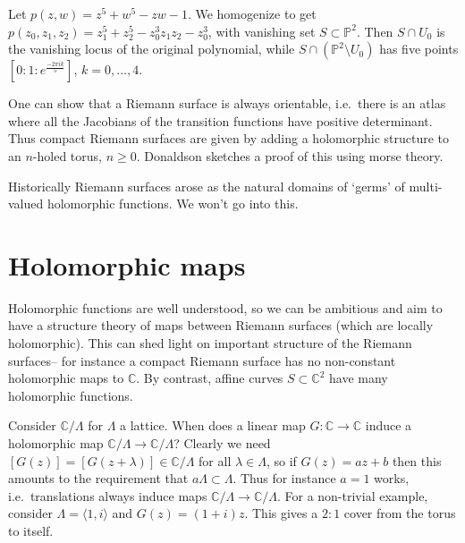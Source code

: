 \begin{example}
    Let \(p(z,w)=z^5+w^5-zw-1\). We homogenize to get
    \(p(z_0,z_1,z_2)=z_1^5+z_2^5-z_0^3z_1z_2-z_0^3\), with vanishing set
    \(S\subset \mathbb{P}^2\). Then \(S\cap U_0\) is the vanishing locus of the
    original polynomial, while \(S\cap (\mathbb{P}^2\setminus U_0)\) has five
    points \([0:1:e^{\frac{-2\pi i k}{5}}]\), \(k=0,\ldots,4\).
\end{example}

\begin{remark}
    One can show that a Riemann surface is always orientable, i.e.\ there is an
    atlas where all the Jacobians of the transition functions have positive
    determinant. Thus compact Riemann surfaces are given by adding a holomorphic
    structure to an \(n\)-holed torus, \(n\geq 0\). Donaldson sketches a proof
    of this using morse theory.
\end{remark}

\begin{remark}
    Historically Riemann surfaces arose as the natural domains of `germs' of
    multi-valued holomorphic functions. We won't go into this.

\end{remark}


\section{Holomorphic maps}
Holomorphic functions are well understood, so we can be ambitious and aim to
have a structure theory of maps between Riemann surfaces (which are locally
holomorphic). This can shed light on important structure of the Riemann
surfaces-- for instance a compact Riemann surface has no non-constant
holomorphic maps to \(\mathbb{C}\). By contrast, affine curves \(S\subset
\mathbb{C}^2\) have many holomorphic functions.

\begin{example}
    Consider \(\mathbb{C}/\Lambda\) for \(\Lambda\) a lattice. When does a
    linear map \(G:\mathbb{C}\to \mathbb{C}\) induce a holomorphic map
    \(\mathbb{C}/\Lambda \to \mathbb{C}/\Lambda\)?
    Clearly we need
    \([G(z)]=[G(z+\lambda)]\in \mathbb{C}/\Lambda\) for all \(\lambda \in
    \Lambda\), so if \(G(z)=az+b\) then this amounts to the requirement that
    \(a\Lambda \subset \Lambda\). Thus for instance \(a=1\) works, i.e.\
    translations always induce maps \(\mathbb{C}/\Lambda \to
    \mathbb{C}/\Lambda.\) For a non-trivial example, consider \(\Lambda=\langle
    1,i\rangle\) and \(G(z)=(1+i)z\). This gives a \(2:1\) cover from the torus
    to itself.
\end{example}

